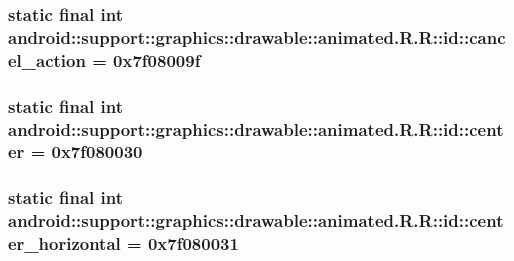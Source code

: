\hypertarget{classandroid_1_1support_1_1graphics_1_1drawable_1_1animated_1_1_r_1_1id_28ff9236a4e1801d9eeae0c97b717102}{
\subsubsection[{cancel\_\-action}]{\setlength{\rightskip}{0pt plus 5cm}static final int android::support::graphics::drawable::animated.R.R::id::cancel\_\-action = 0x7f08009f}}
\label{classandroid_1_1support_1_1graphics_1_1drawable_1_1animated_1_1_r_1_1id_28ff9236a4e1801d9eeae0c97b717102}


\hypertarget{classandroid_1_1support_1_1graphics_1_1drawable_1_1animated_1_1_r_1_1id_c19668e09c264e8b5fdf80f9f5666b02}{
\subsubsection[{center}]{\setlength{\rightskip}{0pt plus 5cm}static final int android::support::graphics::drawable::animated.R.R::id::center = 0x7f080030}}
\label{classandroid_1_1support_1_1graphics_1_1drawable_1_1animated_1_1_r_1_1id_c19668e09c264e8b5fdf80f9f5666b02}


\hypertarget{classandroid_1_1support_1_1graphics_1_1drawable_1_1animated_1_1_r_1_1id_e1d54045ba0c5951feb7fd6877bd6efd}{
\subsubsection[{center\_\-horizontal}]{\setlength{\rightskip}{0pt plus 5cm}static final int android::support::graphics::drawable::animated.R.R::id::center\_\-horizontal = 0x7f080031}}
\label{classandroid_1_1support_1_1graphics_1_1drawable_1_1animated_1_1_r_1_1id_e1d54045ba0c5951feb7fd6877bd6efd}


